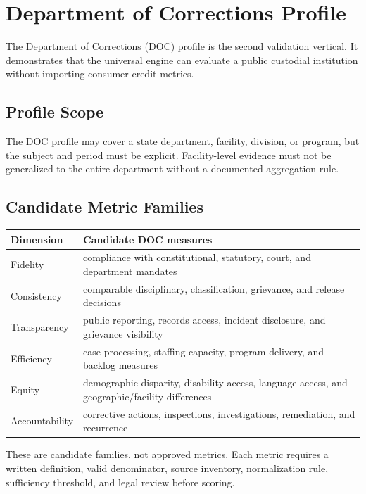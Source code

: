 \section{Department of Corrections Profile}

The Department of Corrections (DOC) profile is the second validation vertical.
It demonstrates that the universal engine can evaluate a public custodial
institution without importing consumer-credit metrics.

\subsection{Profile Scope}

The DOC profile may cover a state department, facility, division, or program,
but the subject and period must be explicit. Facility-level evidence must not
be generalized to the entire department without a documented aggregation rule.

\subsection{Candidate Metric Families}

\begin{center}
\begin{tabular}{p{3.5cm}p{10cm}}
\toprule
Dimension & Candidate DOC measures \\
\midrule
Fidelity & compliance with constitutional, statutory, court, and department mandates \\
Consistency & comparable disciplinary, classification, grievance, and release decisions \\
Transparency & public reporting, records access, incident disclosure, and grievance visibility \\
Efficiency & case processing, staffing capacity, program delivery, and backlog measures \\
Equity & demographic disparity, disability access, language access, and geographic/facility differences \\
Accountability & corrective actions, inspections, investigations, remediation, and recurrence \\
\bottomrule
\end{tabular}
\end{center}

These are candidate families, not approved metrics. Each metric requires a
written definition, valid denominator, source inventory, normalization rule,
sufficiency threshold, and legal review before scoring.

